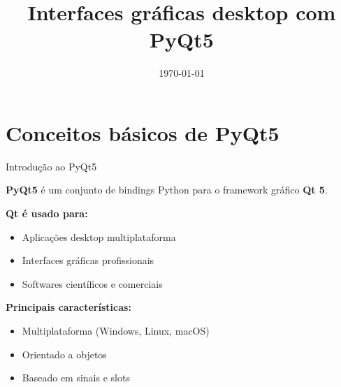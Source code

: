 \documentclass{beamer}
\title{Interfaces gráficas desktop com PyQt5}
\date{\today}
\begin{document}
    
    
    \sumario
    
    \section{Conceitos básicos de PyQt5}
    
    \begin{frame}{Introdução ao PyQt5}
        
        \textbf{PyQt5} é um conjunto de bindings Python para o framework gráfico \textbf{Qt 5}.
        
        \vspace{0.3cm}
        
        \textbf{Qt é usado para:}
        \begin{itemize}
            \item Aplicações desktop multiplataforma
            \item Interfaces gráficas profissionais
            \item Softwares científicos e comerciais
        \end{itemize}
        
        \vspace{0.3cm}
        
        \textbf{Principais características:}
        \begin{itemize}
            \item Multiplataforma (Windows, Linux, macOS)
            \item Orientado a objetos
            \item Baseado em sinais e slots
        \end{itemize}
        
    \end{frame}
    
\end{document}
